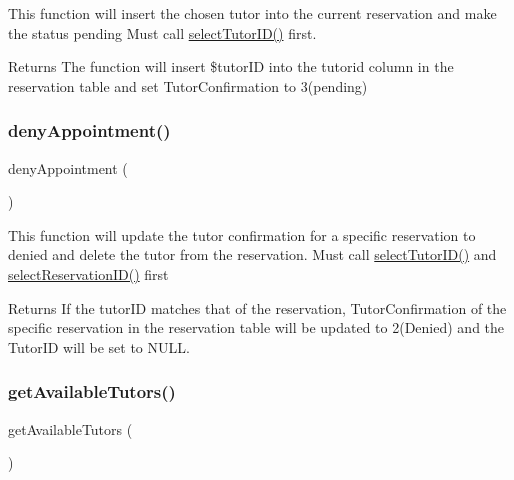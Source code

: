 This function will insert the chosen tutor into the current reservation and make the status pending Must call \mbox{\hyperlink{_tutor___selection_8class_8php_abd658239b3f73bb1c30c51b4f4c4f2a2}{select\+Tutor\+I\+D()}} first. \begin{DoxyReturn}{Returns}
The function will insert \$tutor\+ID into the tutorid column in the reservation table and set Tutor\+Confirmation to 3(pending) 
\end{DoxyReturn}
\mbox{\label{_tutor___selection_8class_8php_a5d29ebf3838fdcd42ffe4db5d4fb4308}} 
\subsubsection{\texorpdfstring{denyAppointment()}{denyAppointment()}}
{\footnotesize\ttfamily deny\+Appointment (\begin{DoxyParamCaption}{ }\end{DoxyParamCaption})}

This function will update the tutor confirmation for a specific reservation to denied and delete the tutor from the reservation. Must call \mbox{\hyperlink{_tutor___selection_8class_8php_abd658239b3f73bb1c30c51b4f4c4f2a2}{select\+Tutor\+I\+D()}} and \mbox{\hyperlink{_tutor___selection_8class_8php_a78fc1624ae4a44a300484ac00e0b9a96}{select\+Reservation\+I\+D()}} first \begin{DoxyReturn}{Returns}
If the tutor\+ID matches that of the reservation, Tutor\+Confirmation of the specific reservation in the reservation table will be updated to 2(Denied) and the Tutor\+ID will be set to N\+U\+LL. 
\end{DoxyReturn}
\mbox{\label{_tutor___selection_8class_8php_a82ba4a18d02d84b563e0ed644c4a846e}} 
\subsubsection{\texorpdfstring{getAvailableTutors()}{getAvailableTutors()}}
{\footnotesize\ttfamily get\+Available\+Tutors (\begin{DoxyParamCaption}{ }\end{DoxyParamCaption})}

